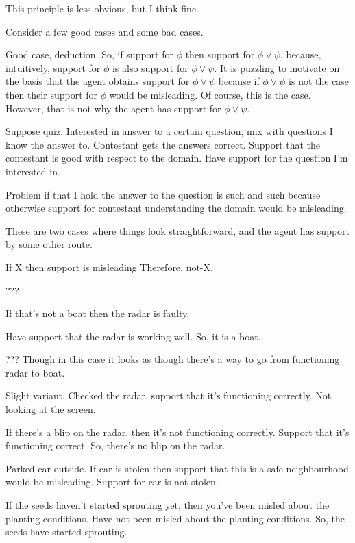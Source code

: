 This principle is less obvious, but I think fine.

Consider a few good cases and some bad cases.

Good case, deduction.
So, if support for \(\phi\) then support for \(\phi \lor \psi\), because, intuitively, support for \(\phi\) is also support for \(\phi \lor \psi\).
It is puzzling to motivate on the basis that the agent obtains support for \(\phi \lor \psi\) because if \(\phi \lor \psi\) is not the case then their support for \(\phi\) would be misleading.
Of course, this is the case.
However, that is not why the agent has support for \(\phi \lor \psi\).


Suppose quiz.
Interested in answer to a certain question, mix with questions I know the answer to.
Contestant gets the answers correct.
Support that the contestant is good with respect to the domain.
Have support for the question I'm interested in.

Problem if that I hold the answer to the question is such and such because otherwise support for contestant understanding the domain would be misleading.

These are two cases where things look straightforward, and the agent has support by some other route.

If X then support is misleading
Therefore, not-X.

???

If that's not a boat then the radar is faulty.

Have support that the radar is working well.
So, it is a boat.

??? Though in this case it looks as though there's a way to go from functioning radar to boat.

Slight variant.
Checked the radar, support that it's functioning correctly.
Not looking at the screen.

If there's a blip on the radar, then it's not functioning correctly.
Support that it's functioning correct.
So, there's no blip on the radar.



Parked car outside.
If car is stolen then support that this is a safe neighbourhood would be misleading.
Support for car is not stolen.


If the seeds haven't started sprouting yet, then you've been misled about the planting conditions.
Have not been misled about the planting conditions.
So, the seeds have started sprouting.

